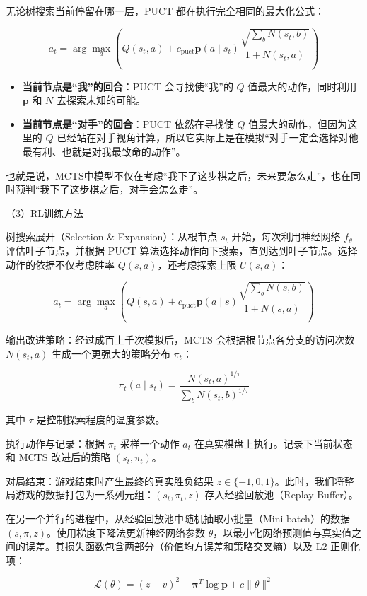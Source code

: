 无论树搜索当前停留在哪一层，PUCT 都在执行完全相同的最大化公式：

\[
a_t=\arg\max_a\left(
Q(s_t,a)+c_{\mathrm{puct}}\mathbf{p}(a\mid s_t)
\frac{\sqrt{\sum_b N(s_t,b)}}{1+N(s_t,a)}
\right)
\]

\begin{itemize}
\tightlist
\item
  \textbf{当前节点是``我''的回合}：PUCT 会寻找使``我''的 \(Q\) 值最大的动作，同时利用 \(\mathbf{p}\) 和 \(N\) 去探索未知的可能。
\item
  \textbf{当前节点是``对手''的回合}：PUCT 依然在寻找使 \(Q\) 值最大的动作，但因为这里的 \(Q\) 已经站在对手视角计算，所以它实际上是在模拟``对手一定会选择对他最有利、也就是对我最致命的动作''。
\end{itemize}

也就是说，MCTS中模型不仅在考虑``我下了这步棋之后，未来要怎么走''，也在同时预判``我下了这步棋之后，对手会怎么走''。

（3）RL训练方法

树搜索展开（Selection \& Expansion）：从根节点 \(s_t\) 开始，每次利用神经网络 \(f_\theta\) 评估叶子节点，并根据 PUCT 算法选择动作向下搜索，直到达到叶子节点。选择动作的依据不仅考虑胜率 \(Q(s,a)\)，还考虑探索上限 \(U(s,a)\)：

\[
a_t=\arg\max_a\left(
Q(s,a)+c_{\mathrm{puct}}\mathbf{p}(a\mid s)
\frac{\sqrt{\sum_b N(s,b)}}{1+N(s,a)}
\right)
\]

输出改进策略：经过成百上千次模拟后，MCTS 会根据根节点各分支的访问次数 \(N(s_t,a)\) 生成一个更强大的策略分布 \(\pi_t\)：

\[
\pi_t(a\mid s_t)=
\frac{N(s_t,a)^{1/\tau}}
{\sum_b N(s_t,b)^{1/\tau}}
\]

其中 \(\tau\) 是控制探索程度的温度参数。

执行动作与记录：根据 \(\pi_t\) 采样一个动作 \(a_t\) 在真实棋盘上执行。记录下当前状态和 MCTS 改进后的策略 \((s_t,\pi_t)\)。

对局结束：游戏结束时产生最终的真实胜负结果 \(z\in\{-1,0,1\}\)。此时，我们将整局游戏的数据打包为一系列元组：\((s_t,\pi_t,z)\) 存入经验回放池（Replay Buffer）。

在另一个并行的进程中，从经验回放池中随机抽取小批量（Mini-batch）的数据 \((s,\pi,z)\)。使用梯度下降法更新神经网络参数 \(\theta\)，以最小化网络预测值与真实值之间的误差。其损失函数包含两部分（价值均方误差和策略交叉熵）以及 L2 正则化项：

\[
\mathcal{L}(\theta)=(z-v)^2-\boldsymbol{\pi}^{T}\log\mathbf{p}+c\lVert\theta\rVert^2
\]

